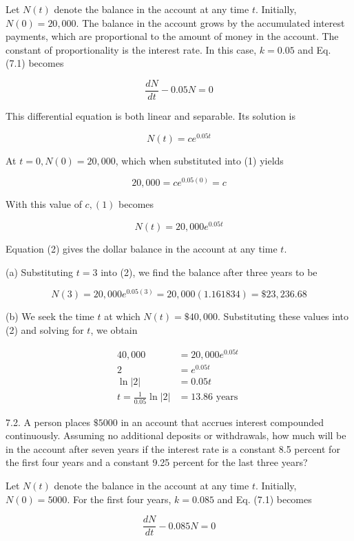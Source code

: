 \documentclass[10pt]{article}
\begin{document}
Let $N(t)$ denote the balance in the account at any time $t$. Initially, $N(0)=20,000$. The balance in the account grows by the accumulated interest payments, which are proportional to the amount of money in the account. The constant of proportionality is the interest rate. In this case, $k=0.05$ and Eq. (7.1) becomes

$$
\frac{d N}{d t}-0.05 N=0
$$

This differential equation is both linear and separable. Its solution is


\begin{equation*}
N(t)=c e^{0.05 t} \tag{1}
\end{equation*}


At $t=0, N(0)=20,000$, which when substituted into (1) yields

$$
20,000=c e^{0.05(0)}=c
$$

With this value of $c,(1)$ becomes


\begin{equation*}
N(t)=20,000 e^{0.05 t} \tag{2}
\end{equation*}


Equation (2) gives the dollar balance in the account at any time $t$.

(a) Substituting $t=3$ into (2), we find the balance after three years to be

$$
N(3)=20,000 e^{0.05(3)}=20,000(1.161834)=\$ 23,236.68
$$

(b) We seek the time $t$ at which $N(t)=\$ 40,000$. Substituting these values into (2) and solving for $t$, we obtain

$$
\begin{aligned}
40,000 & =20,000 e^{0.05 t} \\
2 & =e^{0.05 t} \\
\ln |2| & =0.05 t \\
t=\frac{1}{0.05} \ln |2| & =13.86 \text { years }
\end{aligned}
$$

7.2. A person places $\$ 5000$ in an account that accrues interest compounded continuously. Assuming no additional deposits or withdrawals, how much will be in the account after seven years if the interest rate is a constant 8.5 percent for the first four years and a constant 9.25 percent for the last three years?

Let $N(t)$ denote the balance in the account at any time $t$. Initially, $N(0)=5000$. For the first four years, $k=0.085$ and Eq. (7.1) becomes

$$
\frac{d N}{d t}-0.085 N=0
$$
\end{document}
